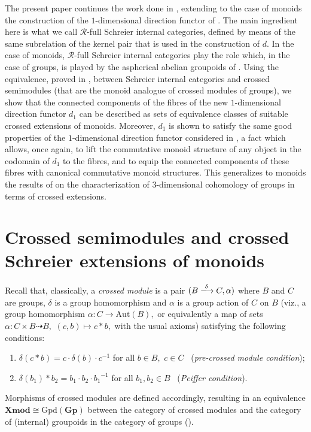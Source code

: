 \documentclass[a4paper]{amsart}
\theoremstyle{plain}
\theoremstyle{definition}
\theoremstyle{remark}
\begin{document}
The present paper continues the work done in \cite{AMR}, extending to the case of monoids the construction of the $1$-dimensional direction functor of \cite{aspherical, Bourn-Rodelo}. The main ingredient here is what we call $\mathcal{R}$-full Schreier internal categories, defined by means of the same subrelation of the kernel pair that is used in the construction of $d.$ In the case of monoids, $\mathcal{R}$-full Schreier internal categories play the role which, in the case of groups, is played by the aspherical abelian groupoids of \cite{aspherical}. Using the equivalence, proved in \cite{P-semi}, between Schreier internal categories and crossed semimodules (that are the monoid analogue of crossed modules of groups), we show that the connected components of the fibres of the new $1$-dimensional direction functor $d_1$ can be described as sets of equivalence classes of suitable crossed extensions of monoids. Moreover, $d_1$ is shown to satisfy the same good properties of the $1$-dimensional direction functor considered in \cite{aspherical, Bourn-Rodelo}, a fact which allows, once again, to lift the commutative monoid structure of any object in the codomain of $d_1$ to the fibres, and to equip the connected components of these fibres with canonical commutative monoid structures. This generalizes to monoids the results of \cite{Holt, Huebschmann} on the characterization of $3$-dimensional cohomology of groups in terms of crossed extensions.


\section{Crossed semimodules and crossed Schreier extensions of monoids}
\label{sec:crossed_semimodules}
Recall that, classically, a \emph{crossed module} \cite{whitehead_1, whitehead_2} is a pair $(B\xlongrightarrow{\delta} C,\alpha)$ where $B$ and $C$ are groups, $\delta$ is a group homomorphism and $\alpha$ is a group action of $C$ on $B$ (viz., a group homomorphism $\alpha\colon C\rightarrow\mathrm{Aut}(B),$ or equivalently a map of sets $\alpha\colon C\times B\dashrightarrow B,$ $(c,b)\mapsto c\ast b,$ with the usual axioms) satisfying the following conditions:
\begin{enumerate}
\item $\delta(c\ast b)=c\cdot\delta(b)\cdot c^ {-1}$ for all $b\in B,$ $c\in C$ \ (\emph{pre-crossed module condition});
\item $\delta(b_1)\ast b_2=b_1\cdot b_2\cdot{b_1}^{-1}$ for all $b_1,b_2\in B$ \ (\emph{Peiffer condition}).
\end{enumerate}
Morphisms of crossed modules are defined accordingly, resulting in an equivalence $\mathbf{Xmod}\cong\mathrm{Gpd}(\mathbf{Gp})$ between the category of crossed modules and the category of (internal) groupoids in the category of groups (\cite{BS}).
\end{document}
